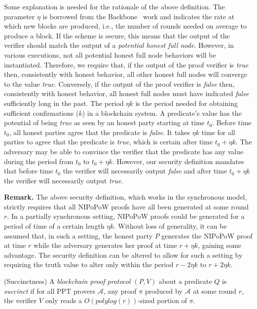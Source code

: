 Some explanation is needed for the rationale of the above definition. The
parameter $\eta$ is borrowed from the Backbone~\cite{backbone} work and
indicates the rate at which new blocks are produced, i.e., the number of rounds
needed on average to produce a block. If the scheme is secure, this means that
the output of the verifier should match the output of a \emph{potential honest
full node}. However, in various executions, not all potential honest full node
behaviors will be instantiated. Therefore, we require that, if the output of the
proof verifier is \emph{true} then, consistently with honest behavior, all other
honest full nodes will converge to the value \emph{true}. Conversely, if the
output of the proof verifier is \emph{false} then, consistently with honest
behavior, all honest full nodes must have indicated \emph{false} sufficiently
long in the past. The period $\eta k$ is the period needed for obtaining
sufficient confirmations ($k$) in a blockchain system. A predicate's value has
the potential of being \emph{true} as seen by an honest party starting at time
$t_0$. Before time $t_0$, all honest parties agree that the predicate is
\emph{false}. It takes $\eta k$ time for all parties to agree that the predicate
is \emph{true}, which is certain after time $t_0 + \eta k$. The adversary may be
able to convince the verifier that the predicate has any value during the period
from $t_0$ to $t_0 + \eta k$. However, our security definition mandates that
before time $t_0$ the verifier will necessarily output \emph{false} and after
time $t_0 + \eta k$ the verifier will necessarily output \emph{true}.

\noindent
\textbf{Remark. } The above security definition, which works in the synchronous
model, strictly requires that all NIPoPoW proofs have all been generated at some
round $r$. In a partially synchronous setting, NIPoPoW proofs could be generated
for a period of time of a certain length $\eta k$. Without loss of generality,
it can be assumed that, in such a setting, the honest party $P$ generates the
NIPoPoW proof at time $r$ while the adversary generates her proof at time
$r + \eta k$, gaining some advantage. The security definition can be altered to
allow for such a setting by requiring the truth value to alter only within the
period $r - 2\eta k$ to $r + 2\eta k$.

\begin{definition}{(Succinctness)}
A \emph{blockchain proof protocol} $(P, V)$ about a predicate $Q$ is
\emph{succinct} if for all PPT provers $\mathcal{A}$, any proof $\pi$ produced
by $\mathcal{A}$ at some round $r$, the verifier $V$ only reads a
$O(polylog(r))$-sized portion of $\pi$.
\end{definition}

